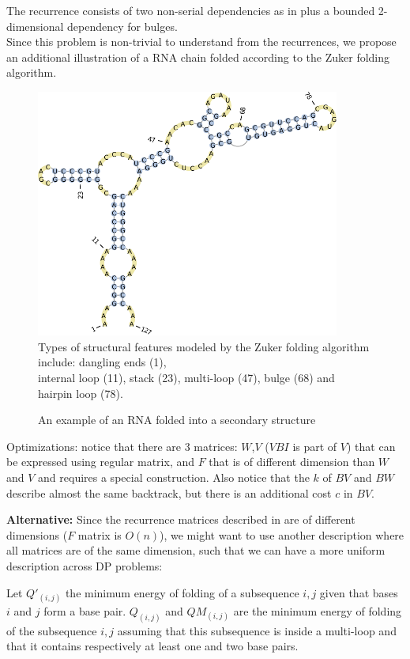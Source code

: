 The recurrence consists of two non-serial dependencies as in \textit{} plus a bounded 2-dimensional dependency for bulges.\\[12pt]
Since this problem is non-trivial to understand from the recurrences, we propose an additional illustration of a RNA chain folded according to the Zuker folding algorithm.
\begin{figure}[H]\begin{center}
\includegraphics[width=10cm]{inc/zuker_struct.pdf} \\
\small Types of structural features modeled by the Zuker folding algorithm include: dangling ends (1), \\ internal loop (11), stack (23), multi-loop (47), bulge (68) and hairpin loop (78).\end{center}\caption{An example of an RNA folded into a secondary structure}\end{figure}

\item Optimizations: notice that there are 3 matrices: $W$,$V$ ($VBI$ is part of $V$) that can be expressed using regular matrix, and $F$ that is of different dimension than $W$ and $V$ and requires a special construction. Also notice that the $k$ of $BV$ and $BW$ describe almost the same backtrack, but there is an additional cost $c$ in $BV$.
\ole

\textbf{Alternative:} Since the recurrence matrices described in \cite{para_dprec} are of different dimensions ($F$ matrix is $O(n)$), we might want to use another description \cite{gpu_rnafold} where all matrices are of the same dimension, such that we can have a more uniform description across DP problems:

Let $Q'_{(i,j)}$ the minimum energy of folding of a subsequence $i,j$ given that bases $i$ and $j$ form a base pair. $Q_{(i,j)}$ and $QM_{(i,j)}$ are the minimum energy of folding of the subsequence $i,j$ assuming that this subsequence is inside a multi-loop and that it contains respectively at least one and two base pairs.

